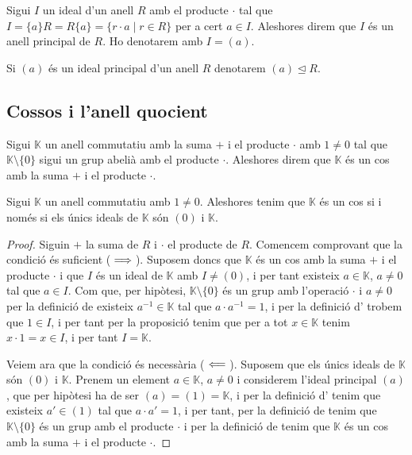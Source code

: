 \documentclass[../../Main.tex]{subfiles}
\begin{document}
	\begin{definition}
		\label{def:ideal principal}
		Sigui \(I\) un ideal d'un anell \(R\) amb el producte \(\cdot\) tal que \(I=\{a\}R=R\{a\}=\{r\cdot a\mid r\in R\}\) per a cert \(a\in I\). Aleshores direm que \(I\) és un anell principal de \(R\). Ho denotarem amb \(I=(a)\).
	\end{definition}
	\begin{notation}
		Si \((a)\) és un ideal principal d'un anell \(R\) denotarem \((a)\trianglelefteq R\).
	\end{notation}
	\subsection{Cossos i l'anell quocient}
	\begin{definition}[Cos] %
		\label{def:cos per anells}
		Sigui \(\mathbb{K}\) un anell commutatiu amb la suma \(+\) i el producte \(\cdot\) amb \(1\neq0\) tal que \(\mathbb{K}\setminus\{0\}\) sigui un grup abelià amb el producte \(\cdot\). Aleshores direm que \(\mathbb{K}\) és un cos amb la suma \(+\) i el producte \(\cdot\).
	\end{definition}
	\begin{proposition}
		\label{prop:condició equivalent a cos per anells}
		Sigui \(\mathbb{K}\) un anell commutatiu amb \(1\neq0\). Aleshores tenim que \(\mathbb{K}\) és un cos si i només si els únics ideals de \(\mathbb{K}\) són \((0)\) i \(\mathbb{K}\).
		\begin{proof}
			Siguin \(+\) la suma de \(R\) i \(\cdot\) el producte de \(R\). Comencem comprovant que la condició és suficient (\(\implies\)). Suposem doncs que \(\mathbb{K}\) és un cos amb la suma \(+\) i el producte \(\cdot\) i que \(I\) és un ideal de \(\mathbb{K}\) amb \(I\neq(0)\), i per tant existeix \(a\in\mathbb{K}\), \(a\neq0\) tal que \(a\in I\). Com que, per hipòtesi, \(\mathbb{K}\setminus\{0\}\) és un grup amb l'operació \(\cdot\) i \(a\ne0\) per la definició de  existeix \(a^{-1}\in\mathbb{K}\) tal que \(a\cdot a^{-1}=1\), i per la definició d' trobem que \(1\in I\), i per tant per la proposició  tenim que per a tot \(x\in\mathbb{K}\) tenim \(x\cdot1=x\in I\), i per tant \(I=\mathbb{K}\).
			
			Veiem ara que la condició és necessària (\(\impliedby\)). Suposem que els únics ideals de \(\mathbb{K}\) són \((0)\) i \(\mathbb{K}\). Prenem un element \(a\in\mathbb{K}\), \(a\neq0\) i considerem l'ideal principal \((a)\), que per hipòtesi ha de ser \((a)=(1)=\mathbb{K}\), i per la definició d' tenim que existeix \(a'\in(1)\) tal que \(a\cdot a'=1\), i per tant, per la definició de  tenim que \(\mathbb{K}\setminus\{0\}\) és un grup amb el producte \(\cdot\) i per la definició de  tenim que \(\mathbb{K}\) és un cos amb la suma \(+\) i el producte \(\cdot\).
		\end{proof}
	\end{proposition}
\end{document}

